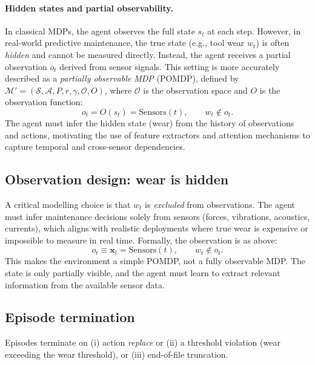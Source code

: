 \documentclass[11pt]{article}
\begin{document}
\paragraph{Hidden states and partial observability.}
In classical MDPs, the agent observes the full state $s_t$ at each step. However, in real-world predictive maintenance, the true state (e.g., tool wear $w_t$) is often \emph{hidden} and cannot be measured directly. Instead, the agent receives a partial observation $o_t$ derived from sensor signals. This setting is more accurately described as a \emph{partially observable MDP} (POMDP), defined by $\mathcal{M}'=(\mathcal{S},\mathcal{A},P,r,\gamma,\mathcal{O},O)$, where $\mathcal{O}$ is the observation space and $O$ is the observation function:
\begin{equation}
  o_t = O(s_t) = \mathrm{Sensors}(t), \qquad w_t \notin o_t.
\end{equation}
The agent must infer the hidden state (wear) from the history of observations and actions, motivating the use of feature extractors and attention mechanisms to capture temporal and cross-sensor dependencies.

\subsection{Observation design: wear is hidden}
A critical modelling choice is that $w_t$ is \emph{excluded} from observations. The agent must infer maintenance decisions solely from sensors (forces, vibrations, acoustics, currents), which aligns with realistic deployments where true wear is expensive or impossible to measure in real time. Formally, the observation is as above:
\begin{equation}
  o_t \equiv \mathbf{x}_t = \mathrm{Sensors}(t),\qquad w_t\notin o_t.
\end{equation}
This makes the environment a simple POMDP, not a fully observable MDP. The state is only partially visible, and the agent must learn to extract relevant information from the available sensor data.

\subsection{Episode termination}
Episodes terminate on (i) action \emph{replace} or (ii) a threshold violation (wear exceeding the wear threshold), or (iii) end-of-file truncation.
\end{document}

